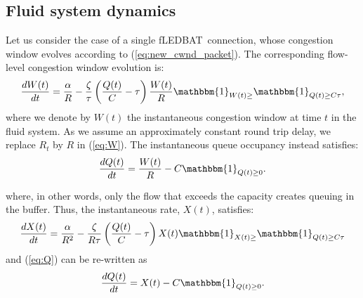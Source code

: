 \documentclass[conference]{IEEEtran}
\newcommand{\I}[1]{{\mathbbm{1}_{#1}}}
\newcommand{\fledbat}[0]{fLEDBAT}
\begin{document}
\subsection{Fluid system dynamics}
Let us consider the case of a single \fledbat\ connection, whose congestion window evolves according to (\ref{eq:new_cwnd_packet}).
The corresponding flow-level congestion window evolution is:
\begin{align}\label{eq:W}
   \frac{dW(t)}{dt}= \frac{\alpha}{R}-\frac{\zeta}{\tau} \left(\frac{Q(t)}{C}-\tau \right)\frac{W(t)}{R}
\I{W(t)\ge } \I{Q(t)\ge C\tau},
\end{align}
where we denote by $W(t)$ the instantaneous congestion window at time $t$ in the fluid system. As we assume an approximately constant round trip delay, we
replace $R_t$ by $R$ in (\ref{eq:W}).
The instantaneous queue occupancy instead satisfies:
\begin{align}\label{eq:Q}
   \frac{dQ(t)}{dt}=\frac{W(t)}{R}-C \I{Q(t)\ge 0}.
\end{align}

\noindent where, in other words, only the flow that exceeds the capacity creates queuing in the buffer.
Thus, the instantaneous rate, $X(t)$, satisfies:
\begin{align}\label{eq:X}
   \frac{dX(t)}{dt}= \frac{\alpha}{R^2}-\frac{\zeta}{R\tau}\left(\frac{Q(t)}{C}-\tau \right) X(t)\I{X(t)\ge } \I{Q(t)\ge C\tau}
\end{align}
and (\ref{eq:Q}) can be re-written as
\begin{align}\label{eq:Q2}
   \frac{dQ(t)}{dt}=X(t)-C \I{Q(t)\ge 0}.
\end{align}
\end{document}
